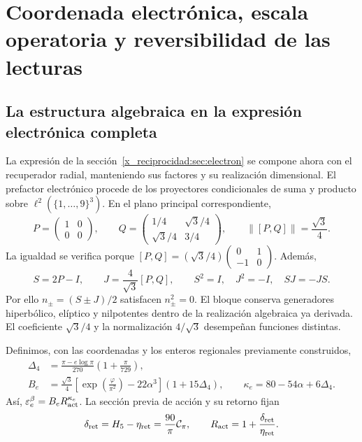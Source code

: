 \chapter{Coordenada electrónica, escala operatoria y reversibilidad de las lecturas}
\label{x_reciprocidad:rec:recuperacion}

\section{La estructura algebraica en la expresión electrónica completa}

La expresión de la sección~\ref{x_reciprocidad:sec:electron} se compone ahora con el recuperador radial, manteniendo sus factores y su realización dimensional. El prefactor electrónico procede de los proyectores condicionales de suma y producto sobre \(\ell^2(\{1,\ldots,9\}^3)\). En el plano principal correspondiente,
\[
 P=\begin{pmatrix}1&0\\0&0\end{pmatrix},\qquad
 Q=\begin{pmatrix}1/4&\sqrt3/4\\\sqrt3/4&3/4\end{pmatrix},
 \qquad\|[P,Q]\|=\frac{\sqrt3}{4}.
\]
La igualdad se verifica porque
\([P,Q]=(\sqrt3/4)\left(\begin{smallmatrix}0&1\\-1&0\end{smallmatrix}\right)\).
Además,
\[
 S=2P-I,\qquad J=\frac4{\sqrt3}[P,Q],\qquad
 S^2=I,\quad J^2=-I,\quad SJ=-JS.
\]
Por ello \(n_\pm=(S\pm J)/2\) satisfacen \(n_\pm^2=0\). El bloque conserva generadores hiperbólico, elíptico y nilpotentes dentro de la realización algebraica ya derivada. El coeficiente \(\sqrt3/4\) y la normalización \(4/\sqrt3\) desempeñan funciones distintas.

Definimos, con las coordenadas y los enteros regionales previamente construidos,
\begin{align}
 \Delta_4&=\frac{\pi-e\log\pi}{270}\left(1+\frac\pi{729}\right),\nonumber\\
 B_e&=\frac{\sqrt3}{4}
       \left[\exp\!\left(\frac\varphi{\pi^2}\right)-22\alpha^3\right]
       (1+15\Delta_4),\qquad
 \kappa_e=80-54\alpha+6\Delta_4.
 \label{x_reciprocidad:rec:eq:electron-basal}
\end{align}
Así, \(\varepsilon_e^{\beta}=B_eR_{\rm act}^{\kappa_e}\). La sección previa de acción y su retorno fijan
\[
 \delta_{\rm ret}=H_5-\eta_{\rm ret}=\frac{90}{\pi}\mathcal C_\pi,
 \qquad R_{\rm act}=1+\frac{\delta_{\rm ret}}{\eta_{\rm ret}}.
\]

